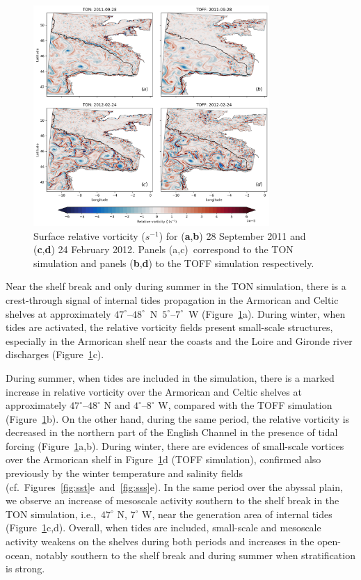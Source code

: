 \documentclass[jmse,article,accept,moreauthors,pdftex]{Definitions/mdpi}
\begin{document}
\begin{figure}[H]
    \centering
    \includegraphics[width=0.8\textwidth]{Definitions/figure7.png}
    \caption{Surface relative vorticity ($s^{-1}$) for (\textbf{a},\textbf{b}) 28 September 2011 and (\textbf{c},\textbf{d}) 24 February 2012. Panels (a,c)~correspond to the TON simulation and panels (\textbf{b},\textbf{d}) to the TOFF simulation respectively.}
    \label{fig:vorticity}
\end{figure}

Near the shelf break and only during summer in the TON simulation, there is a crest-through signal of internal tides propagation in the Armorican and Celtic shelves at approximately $47^\circ${--}$48^\circ$~N~$5^\circ${--}$7^\circ$~W (Figure~\ref{fig:vorticity}a). During winter, when tides are activated, the relative vorticity fields present small-scale structures, especially in the Armorican shelf near the coasts and the Loire and Gironde river discharges (Figure~\ref{fig:vorticity}c).  

During summer, when tides are included in the simulation, there is a marked increase in relative vorticity over the Armorican and Celtic shelves at approximately $47^\circ${--}$48^\circ$ N and $4^\circ${--}$8^\circ$ W, compared with the TOFF simulation (Figure~\ref{fig:vorticity}b). On the other hand, during the same period, the relative vorticity is decreased in the northern part of the English Channel in the presence of tidal forcing (Figure~\ref{fig:vorticity}a,b). During winter, there are evidences of small-scale vortices over the Armorican shelf in Figure~\ref{fig:vorticity}d (TOFF simulation), confirmed also previously by the winter temperature and salinity fields \mbox{(cf. Figures~\ref{fig:sst}e and~\ref{fig:sss}e)}. In the same period over the abyssal plain, we observe an increase of mesoscale activity southern to the shelf break in the TON simulation, i.e.,~$47^\circ$ N, $7^\circ$ W, near the generation area of internal tides (Figure~\ref{fig:vorticity}c,d). Overall, when tides are included, small-scale and mesoscale activity weakens on the shelves during both periods and increases in the open-ocean, notably southern to the shelf break and during summer when stratification is strong.
\end{document}
